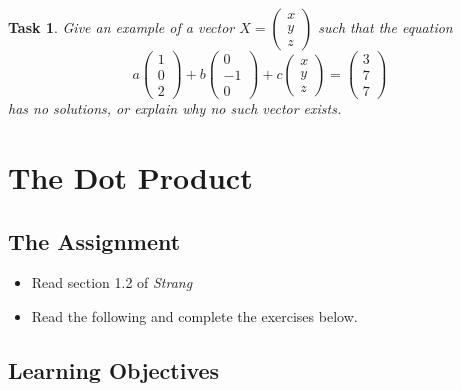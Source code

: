 \documentclass[10pt,]{book}
\theoremstyle{plain}
\numberwithin{equation}{section}
\newtheorem{task}{Task}[chapter]
\begin{document}
\begin{task}
\label{task-12}
Give an example of a vector \(X = \begin{pmatrix} x \\ y \\ z\end{pmatrix}\) such that the equation \[ a \begin{pmatrix} 1 \\ 0 \\ 2 \end{pmatrix} + b \begin{pmatrix} 0 \\ -1 \\ 0\end{pmatrix} + c \begin{pmatrix} x \\ y \\ z\end{pmatrix} = \begin{pmatrix}3 \\ 7 \\ 7 \end{pmatrix}\] has no solutions, or explain why no such vector exists.%
\end{task}
\clearpage
\typeout{************************************************}
\typeout{************************************************}
\section[The Dot Product]{The Dot Product}\label{dot-product}
\typeout{************************************************}
\typeout{************************************************}
\subsection[The Assignment]{The Assignment}\label{subsection-5}
\begin{itemize}
\item{}Read section 1.2 of \emph{Strang}\item{}Read the following and complete the exercises below.\end{itemize}
\typeout{************************************************}
\typeout{************************************************}
\subsection[Learning Objectives]{Learning Objectives}\label{subsection-6}
\end{document}
